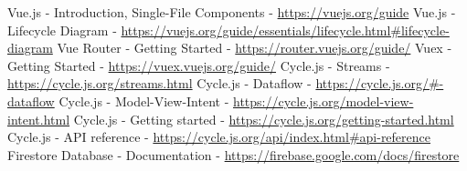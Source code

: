 \documentclass[shortabstract]{iithesis}
\theoremstyle{definition} \newtheorem{definition}{Definicja}[]
\theoremstyle{remark} \newtheorem{remark}[definition]{Observation}
\theoremstyle{plain} \newtheorem{theorem}[definition]{Theorem}
\theoremstyle{plain} \newtheorem{lemma}[definition]{Lemma}
\begin{document}

\begin{thebibliography}{1}
     Vue.js - Introduction, Single-File Components - \url{https://vuejs.org/guide}
     Vue.js - Lifecycle Diagram - \url{https://vuejs.org/guide/essentials/lifecycle.html#lifecycle-diagram}
     Vue Router - Getting Started - \url{https://router.vuejs.org/guide/}
     Vuex - Getting Started - \url{https://vuex.vuejs.org/guide/}
     Cycle.js - Streams - \url{https://cycle.js.org/streams.html}
     Cycle.js - Dataflow - \url{https://cycle.js.org/#-dataflow}
     Cycle.js - Model-View-Intent - \url{https://cycle.js.org/model-view-intent.html}
     Cycle.js - Getting started - \url{https://cycle.js.org/getting-started.html}
     Cycle.js - API reference - \url{https://cycle.js.org/api/index.html#api-reference}
     Firestore Database - Documentation - \url{https://firebase.google.com/docs/firestore}
\end{thebibliography}
\end{document}
